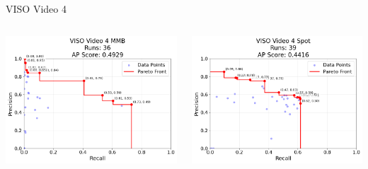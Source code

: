 \begin{frame}{VISO Video 4}
    \begin{columns}
        \begin{column}{0.48\textwidth}
            \centering
            \includegraphics[width=\textwidth,height=0.7\textheight,keepaspectratio]{images/bom/VISO_Video_4_MMB_36.png}
        \end{column}
        \begin{column}{0.48\textwidth}
            \centering
            \includegraphics[width=\textwidth,height=0.7\textheight,keepaspectratio]{images/bom/VISO_Video_4_Spot_39.png}
        \end{column}
    \end{columns}
\end{frame}

